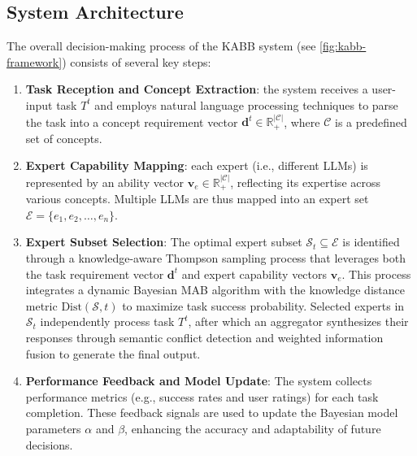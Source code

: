 \subsection{System Architecture}
The overall decision-making process of the KABB system (see \cref{fig:kabb-framework}) consists of several key steps:
\label{sec:system_arch}
\begin{enumerate}
    \item \textbf{Task Reception and Concept Extraction}: the system receives a user-input task $T^t$ and employs natural language processing techniques to parse the task into a concept requirement \cite{1,11,111}vector $\mathbf{d}^t \in \mathbb{R}_+^{|\mathcal{C}|}$, where $\mathcal{C}$ is a predefined set of concepts.
    \item \textbf{Expert Capability Mapping}: each expert\cite{GPT2} (i.e., different LLMs\cite{yuxunl}) is represented by an ability vector $\mathbf{v}_e \in \mathbb{R}_+^{|\mathcal{C}|}$, reflecting its expertise across various concepts. Multiple LLMs are thus mapped into an expert set $\mathcal{E} = \{e_1, e_2, \ldots, e_n\}$.
    \item \textbf{Expert Subset Selection}: The optimal expert subset $\mathcal{S}_t \subseteq \mathcal{E}$ is identified through a knowledge-aware Thompson sampling process that leverages both the task requirement vector $\mathbf{d}^t$ and expert capability vectors $\mathbf{v}_e$. This process integrates a dynamic Bayesian MAB algorithm with the knowledge distance metric $\text{Dist}(\mathcal{S}, t)$ to maximize task success probability. Selected experts in $\mathcal{S}_t$ independently process task $T^t$, after which an aggregator synthesizes their responses through semantic conflict detection and weighted information fusion to generate the final output.
    \item \textbf{Performance Feedback and Model Update}: The system collects performance metrics (e.g., success rates and user ratings) for each task completion. These feedback signals are used to update the Bayesian model parameters $\alpha$ and $\beta$, enhancing the accuracy and adaptability of future decisions.
\end{enumerate}

